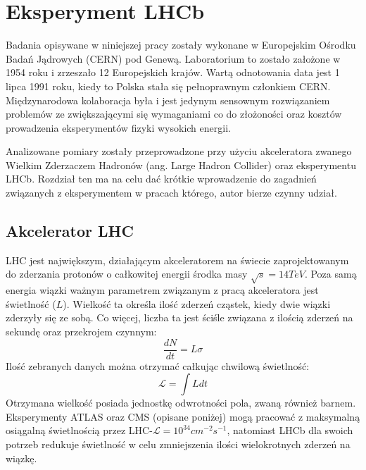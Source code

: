 \chapter{Eksperyment LHCb}

Badania opisywane w niniejszej pracy zostały wykonane w Europejskim Ośrodku Badań Jądrowych (CERN) pod Genewą. Laboratorium to zostało założone w 1954 roku i zrzeszało 12 Europejskich krajów. Wartą odnotowania data jest 1 lipca  1991 roku, kiedy to Polska stała się pełnoprawnym członkiem CERN. Międzynarodowa kolaboracja była i jest jedynym sensownym rozwiązaniem problemów ze zwiększającymi się wymaganiami co do złożoności oraz kosztów prowadzenia eksperymentów fizyki wysokich energii.

Analizowane pomiary zostały przeprowadzone przy użyciu akceleratora zwanego Wielkim Zderzaczem Hadronów (ang. Large Hadron Collider) oraz eksperymentu LHCb. Rozdział ten ma na celu dać krótkie wprowadzenie do zagadnień związanych z eksperymentem w pracach którego, autor bierze czynny udział. 

\section{Akcelerator LHC}
\indent LHC jest największym, działającym akceleratorem na świecie zaprojektowanym do zderzania protonów o całkowitej energii środka masy $\sqrt{s}=14 TeV$. Poza samą energia wiązki ważnym parametrem związanym z pracą akceleratora jest  świetlność ($L$). Wielkość ta określa ilość zderzeń cząstek, kiedy dwie wiązki zderzyły się ze sobą. Co więcej, liczba ta jest ściśle związana z ilością zderzeń na sekundę oraz przekrojem czynnym:
\begin{equation}
\frac{dN}{dt} =L \sigma
\end{equation}
Ilość zebranych danych można otrzymać całkując chwilową świetlność:
\begin{equation}
\mathcal{L} = \int L dt
\end{equation}
Otrzymana wielkość posiada jednostkę odwrotności pola, zwaną również barnem. Eksperymenty ATLAS oraz CMS (opisane poniżej) mogą pracować z maksymalną osiągalną świetlnością przez LHC-$\mathcal{L}=10^{34}cm^{-2}s^{-1}$, natomiast LHCb dla swoich potrzeb redukuje świetlność w celu zmniejszenia ilości wielokrotnych zderzeń na wiązkę. 


